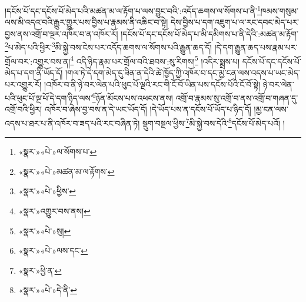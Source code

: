 །དངོས་པོ་དང་དངོས་པོ་མེད་པའི་མཚན་མ་ལ་རྟོག་པ་ལས་བྱུང་བའི་:འདོད་ཆགས་ལ་སོགས་པ་ནི་\footnote{«སྣར་»«པེ་»ལ་སོགས་པ་}ཁམས་གསུམ་ལས་མི་འདའ་བའི་རྒྱུར་གྱུར་པས་བྱིས་པ་རྣམས་ནི་འཆིང་བ་སྟེ། དེས་བྱིས་པ་དག་འཇུག་པ་ལ་རང་དབང་མེད་པར་བྱས་ནས་འགྲོ་བ་ལྔར་འཁོར་བ་ན་འཁོར་རོ། །དངོས་པོ་དང་དངོས་པོ་མེད་པ་མི་དམིགས་པ་ནི་དེའི་:མཚན་མ་རྟོག་\footnote{«སྣར་»«པེ་»མཚན་མ་ལ་རྟོགས་}པ་མེད་པའི་ཕྱིར་\footnote{«སྣར་»«པེ་»ཕྱིས་}མི་སྐྱེ་བས་ངེས་པར་འདོད་ཆགས་ལ་སོགས་པའི་རྒྱུན་ཆད་དོ། །དེ་དག་རྒྱུན་ཆད་པས་རྣམ་པར་གྲོལ་བར་:འགྱུར་བས་ན།\footnote{«སྣར་»འགྱུར་བས་ནས།} འདི་ཉིད་རྣམ་པར་གྲོལ་བའི་ཐབས་:སུ་རིགས།\footnote{«སྣར་»«པེ་»སུ།} །འདིར་སྨྲས་པ། དངོས་པོ་དང་དངོས་པོ་མེད་པ་དག་ནི་ཡོད་དོ། །གལ་ཏེ་དེ་དག་མེད་དུ་ཟིན་ན་དེའི་ཚེ་ཁྱོད་ཀྱི་འཁོར་བ་དང་མྱ་ངན་ལས་འདས་པ་ཡང་མེད་པར་འགྱུར་རོ། །འཁོར་བ་ནི་ཉེ་བར་ལེན་པའི་ཕུང་པོ་ལྔའི་རང་གི་ངོ་བོ་ཡིན་པས་དངོས་པོའི་ངོ་བོ་སྟེ། ཉེ་བར་ལེན་པའི་ཕུང་པོ་ལྔ་པོ་དེ་དག་ཉིད་ལས་\footnote{«སྣར་»«པེ་»ལས་དང་}ཉོན་མོངས་པས་འཕངས་ནས། འགྲོ་བ་རྣམས་སུ་འགྲོ་བ་ནས་འགྲོ་བ་གཞན་དུ་འགྲོ་བའི་ཕྱིར། འཁོར་བ་ཞེས་བྱ་བས་ན་དེ་ཡང་ཡོད་དོ། །དེ་ཡོད་པས་ན་དངོས་པོ་ཡོད་པ་ཉིད་དོ། །མྱ་ངན་ལས་འདས་པ་ཐར་པ་ནི་འཁོར་བ་ཟད་པའི་རང་བཞིན་ཏེ། སྡུག་བསྔལ་ཕྱིས་\footnote{«སྣར་»ཕྱི་ན་}མི་སྐྱེ་བས་དེའི་\footnote{«སྣར་»«པེ་»དེ་ནི་}དངོས་པོ་མེད་པའོ། །
